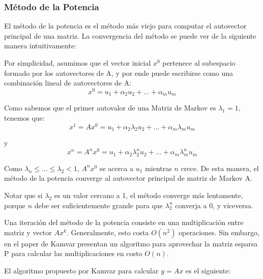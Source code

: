 \subsubsection{Método de la Potencia}

\par El método de la potencia es el método más viejo para computar el autovector principal de una matriz. La convergencia del método se puede ver de la siguiente manera intuitivamente:
\par Por simplicidad, asumimos que el vector inicial $x^0$ pertenece al subespacio formado por los autovectores de A, y por ende puede escribirse como una combinación lineal de autovectores de A: 
\begin{equation*}
x^0 = u_1 + \alpha_2 u_2 + ... + \alpha_m u_m
\end{equation*}
\par Como sabemos que el primer autovalor de una Matriz de Markov es $\lambda_1 = 1$, tenemos que:
\begin{equation*}
x^1 = Ax^0 = u_1 + \alpha_2 \lambda_2 u_2 + ... + \alpha_m \lambda_m u_m
\end{equation*}
\par y 
\begin{equation*}
x^n = A^n x^0 = u_1 + \alpha_2 \lambda_2^n u_2 + ... + \alpha_m \lambda_m^n u_m
\end{equation*}
\par Como $\lambda_n \leq ... \leq \lambda_2 < 1$, $A^n x^0$ se acerca a $u_1$ mientras $n$ crece. De esta manera, el método de la potencia converge al autovector principal de matriz de Markov A.
\par Notar que si $\lambda_2$ es un valor cercano a 1, el método converge más lentamente, porque $n$ debe ser suficientemente grande para que $\lambda_2^n$ converja a 0, y viceversa.

\par Una iteración del método de la potencia consiste en una multiplicación entre matriz y vector $A x^k$. Generalmente, esto costa $O(n^2)$ operaciones. Sin embargo, en el paper de Kamvar presentan un algoritmo para aprovechar la matriz esparsa P para calcular las multiplicaciones en costo $O(n)$. 

\par El algoritmo propuesto por Kamvar \cite{Kamvar2003} para calcular $y = Ax$ es el siguiente: \newline 

\noindent{}

